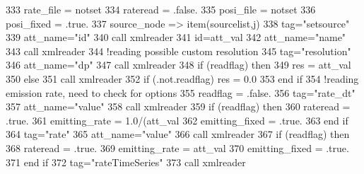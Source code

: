 \begin{DoxyCode}
333         rate\_file = notset
334         rateread = .false.
335         posi\_file = notset
336         posi\_fixed = .true.
337         source\_node => item(sourcelist,j)
338         tag=\textcolor{stringliteral}{"setsource"}
339         att\_name=\textcolor{stringliteral}{"id"}
340         \textcolor{keyword}{call }xmlreader%
341         id=att\_val%
342         att\_name=\textcolor{stringliteral}{"name"}
343         \textcolor{keyword}{call }xmlreader%
344         \textcolor{comment}{!reading possible custom resolution}
345         tag=\textcolor{stringliteral}{"resolution"}
346         att\_name=\textcolor{stringliteral}{"dp"}
347         \textcolor{keyword}{call }xmlreader%
348         \textcolor{keywordflow}{if} (readflag) \textcolor{keywordflow}{then}
349             res = att\_val%
350         \textcolor{keywordflow}{else}
351             \textcolor{keyword}{call }xmlreader%
352             \textcolor{keywordflow}{if} (.not.readflag) res = 0.0
353 \textcolor{keywordflow}{        end if}
354         \textcolor{comment}{!reading emission rate, need to check for options}
355         readflag = .false.
356         tag=\textcolor{stringliteral}{"rate\_dt"}
357         att\_name=\textcolor{stringliteral}{"value"}
358         \textcolor{keyword}{call }xmlreader%
359         \textcolor{keywordflow}{if} (readflag) \textcolor{keywordflow}{then}
360             rateread = .true.
361             emitting\_rate = 1.0/(att\_val%
362             emitting\_fixed = .true.
363 \textcolor{keywordflow}{        end if}
364         tag=\textcolor{stringliteral}{"rate"}
365         att\_name=\textcolor{stringliteral}{"value"}
366         \textcolor{keyword}{call }xmlreader%
367         \textcolor{keywordflow}{if} (readflag) \textcolor{keywordflow}{then}
368             rateread = .true.
369             emitting\_rate = att\_val%
370             emitting\_fixed = .true.
371 \textcolor{keywordflow}{        end if}
372         tag=\textcolor{stringliteral}{"rateTimeSeries"}
373         \textcolor{keyword}{call }xmlreader%

\end{DoxyCode}
